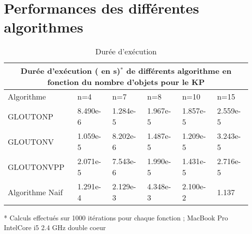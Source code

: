 \documentclass[a4paper,11,answers
]{exam}
\begin{document}
\section{Performances des différentes algorithmes}
\begin{table}[h]
\begin{tabular}{ |p{2.6cm}|p{1.3cm}|p{1.3cm}|p{1.3cm}|p{1.3cm}|p{1.3cm}| }
\hline
\multicolumn{6}{|c|}{Durée d'exécution ( en s)$^*$ de différents algorithme en fonction du nombre d'objets pour le KP} \\
\hline
Algorithme& n=4&n=7&n=8& n=10&n=15\\
\hline
GLOUTONP & 8.490e-6 &1.284e-5&1.967e-5 & 1.857e-5 &2.559e-5 \\
GLOUTONV & 1.059e-5   & 8.202e-6&1.487e-5 & 1.209e-5 &3.243e-5 \\
GLOUTONVPP &2.071e-5 & 7.543e-6 &1.990e-5 & 1.431e-5 &2.716e-5\\
\rowcolor{red}Algorithme Naif    &1.291e-4& 2.129e-3&4.348e-3 & 2.100e-2 &1.137 \\
\hline
\end{tabular}
\caption{Durée d'exécution}
\end{table}
 \vspace{2mm}
  * Calculs effectués sur 1000 itérations pour chaque fonction ; MacBook Pro IntelCore i5 2.4 GHz double coeur\\
  \vspace{5mm}
\end{document}
